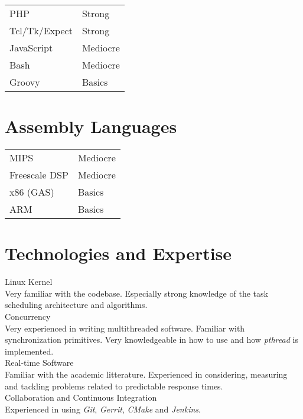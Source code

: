 \documentclass[12pt]{article}
\begin{document}
\begin{tabular}{ll}
PHP & Strong\\
Tcl/Tk/Expect & Strong\\
JavaScript & Mediocre\\
Bash & Mediocre\\
Groovy & Basics\\
\end{tabular}


\section*{Assembly Languages}

\begin{tabular}{ll}
MIPS & Mediocre\\
Freescale DSP & Mediocre\\
x86 (GAS) & Basics\\
ARM & Basics\\
\end{tabular}


\section*{Technologies and Expertise}

\large{Linux Kernel}\\
\normalsize{Very familiar with the codebase. Especially strong knowledge of the
task scheduling architecture and algorithms.}\\

\large{Concurrency}\\
\normalsize{Very experienced in writing multithreaded software. Familiar with
synchronization primitives. Very knowledgeable in how to use and how
\emph{pthread} is implemented.}\\

\large{Real-time Software}\\
\normalsize{Familiar with the academic litterature. Experienced in considering,
measuring and tackling problems related to predictable response times.}\\

\large{Collaboration and Continuous Integration}\\
\normalsize{Experienced in using \emph{Git}, \emph{Gerrit}, \emph{CMake} and
\emph{Jenkins}.}\\
\end{document}
